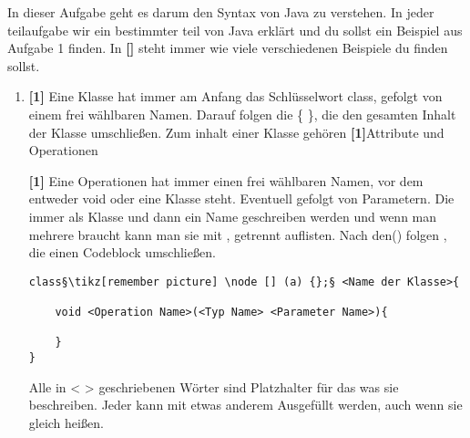 
In dieser Aufgabe geht es darum den Syntax von Java zu verstehen.
In jeder teilaufgabe wir ein bestimmter teil von Java erklärt und du sollst ein Beispiel aus Aufgabe 1 finden. In \textbf{[]} steht immer wie viele verschiedenen Beispiele du finden sollst.

\begin{enumerate}
    \item \textbf{[1]} Eine Klasse hat immer am Anfang das Schlüsselwort class, gefolgt von einem frei wählbaren Namen. Darauf folgen die \{ \}, die den gesamten Inhalt der Klasse umschließen.
          Zum inhalt einer Klasse gehören \textbf{[1]}Attribute und Operationen

          \textbf{[1]} Eine Operationen hat immer einen frei wählbaren Namen, vor dem entweder void oder eine Klasse steht. Eventuell gefolgt von Parametern. Die immer als Klasse und dann ein Name geschreiben werden und wenn man mehrere braucht kann man sie mit , getrennt auflisten.
          Nach den() folgen {}, die einen Codeblock umschließen.

          \begin{lstlisting}[title={\textbf{Beispiel für eine Klasse}}]
class§\tikz[remember picture] \node [] (a) {};§ <Name der Klasse>{
        
    void <Operation Name>(<Typ Name> <Parameter Name>){
                
    }                    
}
                \end{lstlisting}
          Alle in < > geschriebenen Wörter sind Platzhalter für das was sie beschreiben. Jeder kann mit etwas anderem Ausgefüllt werden, auch wenn sie gleich heißen.


\end{enumerate}
